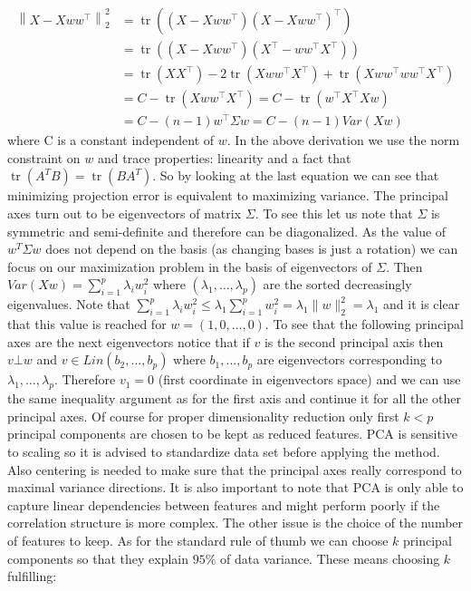 \documentclass[shortabstract, english, mgr]{iithesis}
\begin{document}
\begin{align*}
\left\|X-X w w^{\top}\right\|^{2}_2 &=\operatorname{tr}\left(\left(X-X w w^{\top}\right)\left(X-X w w^{\top}\right)^{\top}\right) \\ &=\operatorname{tr}\left(\left(X-X w w^{\top}\right)\left(X^{\top}-w w^{\top} X^{\top}\right)\right) \\ &=\operatorname{tr}\left(X X^{\top}\right)-2 \operatorname{tr}\left(X w w^{\top} X^{\top}\right)+\operatorname{tr}\left(X w w^{\top} w w^{\top} X^{\top}\right) \\ &=C-\operatorname{tr}\left(X w w^{\top} X^{\top}\right)=C-\operatorname{tr}\left(w^{\top} X^{\top} X w\right) \\ &=C-(n-1)w^{\top} \Sigma w = C - (n-1)Var(Xw)
\end{align*} where C is a constant independent of $w$. In the above derivation we use the norm constraint on $w$ and trace properties: linearity and a fact that $\operatorname{tr}\left(A^TB\right) = \operatorname{tr}\left(BA^T\right)$. So by looking at the last equation we can see that minimizing projection error is equivalent to maximizing variance. The principal axes turn out to be eigenvectors of matrix $\Sigma$. To see this let us note that $\Sigma$ is symmetric and semi-definite and therefore can be diagonalized. As the value of $w^T\Sigma w$ does not depend on the basis (as changing bases is just a rotation) we can focus on our maximization problem in the basis of eigenvectors of $\Sigma$. Then $Var(Xw) = \sum_{i=1}^p \lambda_i w_i^2$ where $(\lambda_1, \ldots, \lambda_p)$ are the sorted decreasingly eigenvalues. Note that $\sum_{i=1}^p \lambda_i w_i^2 \leq \lambda_1 \sum_{i=1}^p w_i^2 = \lambda_1 \| w\|_2^2 = \lambda_1$ and it is clear that this value is reached for $w = (1, 0, \ldots, 0)$. To see that the following principal axes are the next eigenvectors notice that if $v$ is the second principal axis then $v \bot w$ and $v \in Lin(b_2, \ldots, b_p)$ where $b_1, \ldots, b_p$ are eigenvectors corresponding to $\lambda_1, \ldots, \lambda_p$. Therefore $v_1 = 0$ (first coordinate in eigenvectors space) and we can use the same inequality argument as for the first axis and continue it for all the other principal axes. Of course for proper dimensionality reduction only first $k < p$ principal components are chosen to be kept as reduced features. 
PCA is sensitive to scaling so it is advised to standardize data set before applying the method. Also centering is needed to make sure that the principal axes really correspond to maximal variance directions. It is also important to note that PCA is only able to capture linear dependencies between features and might perform poorly if the correlation structure is more complex. The other issue is the choice of the number of features to keep. As for the standard rule of thumb we can choose $k$ principal components so that they explain $95\%$ of data variance. These means choosing $k$ fulfilling:
\end{document}
